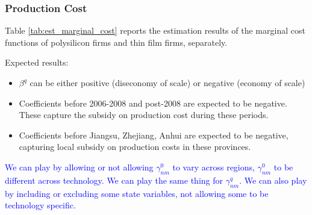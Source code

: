 \documentclass[12pt]{article}
\begin{document}
\subsubsection{Production Cost}

Table \ref{tab:est_marginal_cost} reports the estimation results of the marginal cost functions of polysilicon firms and thin film firms, separately.

Expected results:
\begin{itemize}
    \item $\beta^q$ can be either positive (diseconomy of scale) or negative (economy of scale)
    \item Coefficients before 2006-2008 and post-2008 are expected to be negative. These capture the subsidy on production cost during these periods.
    \item Coefficients before Jiangsu, Zhejiang, Anhui are expected to be negative, capturing local subsidy on production costs in these provinces.
\end{itemize}

\textcolor{blue}{We can play by allowing or not allowing $\gamma^0_{nm}$ to vary across regions, $\gamma^0_{nm}$ to be different across technology. We can play the same thing for $\gamma^q_{nm}$. We can also play by including or excluding some state variables, not allowing some to be technology specific.}

\end{document}
